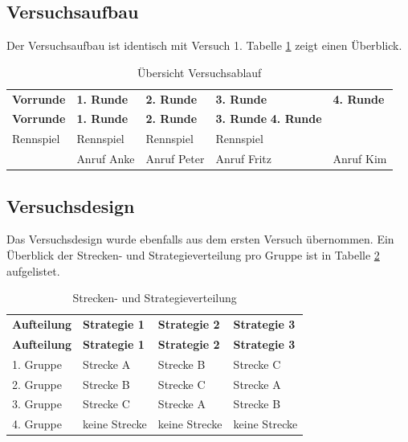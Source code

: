 \documentclass[12pt,a4paper]{scrartcl}
\begin{document}
\subsection{Versuchsaufbau}
Der Versuchsaufbau ist identisch mit Versuch 1.
Tabelle \ref{ablauf} zeigt einen Überblick.

\begin{longtable}{p{}p{}p{}p{}p{} }
	\label{ablauf}\\
	\caption[Übersicht Versuchsablauf]{Übersicht Versuchsablauf}\\
	\hline
	\textbf{Vorrunde}&\textbf{1. Runde}&\textbf{2. Runde} &\textbf{3. Runde} & \textbf{4. Runde}\\
	\hline
	\endfirsthead
	\hline
	\textbf{Vorrunde}&\textbf{1. Runde}&\textbf{2. Runde} &\textbf{3. Runde} \textbf{4. Runde}\\
	\hline
	\endhead
Rennspiel & Rennspiel & Rennspiel & Rennspiel &\\
 & Anruf Anke & Anruf Peter & Anruf Fritz & Anruf Kim \\
\hline
\end{longtable}

\subsection{Versuchsdesign}
Das Versuchsdesign wurde ebenfalls aus dem ersten Versuch übernommen.
Ein Überblick der Strecken- und Strategieverteilung pro Gruppe ist in Tabelle \ref{verteilung} aufgelistet. 

\begin{longtable}{p{3cm}p{3cm}p{3cm}p{3cm} }
	\label{verteilung}\\
	\caption[Strecken- und Strategieverteilung]{Strecken- und Strategieverteilung}\\
	\hline
	\textbf{Aufteilung}&\textbf{Strategie 1}&\textbf{Strategie 2} &\textbf{Strategie 3}\\
	\hline
	\endfirsthead
	\hline
	\textbf{Aufteilung}&\textbf{Strategie 1}&\textbf{Strategie 2} &\textbf{Strategie 3}\\
	\hline
	\endhead
1. Gruppe & Strecke A & Strecke B & Strecke C \\
2. Gruppe & Strecke B & Strecke C & Strecke A \\
3. Gruppe  & Strecke C & Strecke A & Strecke B \\
4. Gruppe   & keine Strecke & keine Strecke & keine Strecke\\ 
\hline
\end{longtable}
\end{document}
